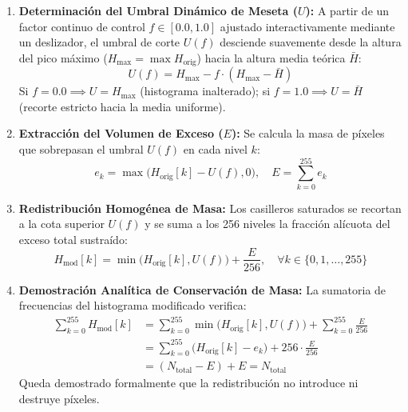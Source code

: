 \documentclass{article}
\begin{document}
\begin{enumerate}
    \item \textbf{Determinación del Umbral Dinámico de Meseta ($U$):}
    A partir de un factor continuo de control $f \in [0.0, 1.0]$ ajustado interactivamente mediante un deslizador, el umbral de corte $U(f)$ desciende suavemente desde la altura del pico máximo ($H_{\max} = \max H_{\text{orig}}$) hacia la altura media teórica $\bar{H}$:
    \begin{equation}
        \label{eq:umbral}
        U(f) = H_{\max} - f \cdot (H_{\max} - \bar{H})
    \end{equation}
    Si $f = 0.0 \implies U = H_{\max}$ (histograma inalterado); si $f = 1.0 \implies U = \bar{H}$ (recorte estricto hacia la media uniforme).

    \item \textbf{Extracción del Volumen de Exceso ($E$):}
    Se calcula la masa de píxeles que sobrepasan el umbral $U(f)$ en cada nivel $k$:
    \begin{equation}
        e_k = \max\big(H_{\text{orig}}[k] - U(f), 0\big), \quad E = \sum_{k=0}^{255} e_k
    \end{equation}

    \item \textbf{Redistribución Homogénea de Masa:}
    Los casilleros saturados se recortan a la cota superior $U(f)$ y se suma a los 256 niveles la fracción alícuota del exceso total sustraído:
    \begin{equation}
        \label{eq:hist_mod}
        H_{\text{mod}}[k] = \min\big(H_{\text{orig}}[k], U(f)\big) + \frac{E}{256}, \quad \forall k \in \{0, 1, \dots, 255\}
    \end{equation}

    \item \textbf{Demostración Analítica de Conservación de Masa:}
    La sumatoria de frecuencias del histograma modificado verifica:
    \begin{align}
        \sum_{k=0}^{255} H_{\text{mod}}[k] &= \sum_{k=0}^{255} \min\big(H_{\text{orig}}[k], U(f)\big) + \sum_{k=0}^{255} \frac{E}{256} \nonumber \\
        &= \sum_{k=0}^{255} \big(H_{\text{orig}}[k] - e_k\big) + 256 \cdot \frac{E}{256} \nonumber \\
        &= (N_{\text{total}} - E) + E = N_{\text{total}}
    \end{align}
    Queda demostrado formalmente que la redistribución no introduce ni destruye píxeles.


\end{enumerate}
\end{document}
